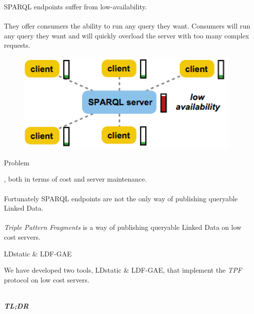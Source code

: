 \documentclass[20pt]{extarticle}
\newcommand{\cmr}{\fontencoding{T1}\fontfamily{cmr}\selectfont} %
\begin{document}
{\fontsize{30}{30} {\cmr 
\noindent SPARQL endpoints {\color{blue}suffer from low-availability.}
\\ \\
They offer consumers the ability to run any query they want. Consumers will run any query they want and will quickly overload the server with too many complex requests.
}
\vspace{10 mm}
\begin{figure}[ht!]
\centering
\includegraphics[width=110mm]{sparql.png}
\end{figure}



\newpage

 \begin{center}
{\fontsize{35}{35}\color{blue} \sc Problem}
\end{center}

\vspace{10 mm}

{\fontsize{30}{30} {\cmr 
{}, both in terms of cost and server maintenance.
\\ \\
Fortunately SPARQL endpoints are not the only way of publishing queryable Linked Data.
\\ \\
\textit{Triple Pattern Fragments} is a way of publishing queryable Linked Data on low cost servers.
}} 

\newpage


\begin{center}
{\fontsize{35}{35}\color{blue} \sc LDstatic \& LDF-GAE}
\end{center}
\vspace{20 mm}
{\fontsize{30}{30} {\cmr 
\noindent We have developed two tools, LDstatic \& LDF-GAE, that implement the \textit{TPF} protocol on low cost servers.
\\ \\
{\color{blue} 
\textbf{\textit{TL;DR}}

}}}}
\end{document}
